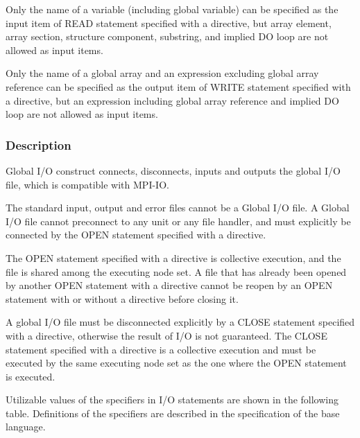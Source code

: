    Only the name of a variable (including global variable) can be specified 
   as the input item of READ statement specified with a \gio directive,
   but array element, array section,
   structure component, substring, and implied DO loop are not allowed as input items.

   Only the name of a global array
   and an expression excluding global array reference can be specified
   as the output item
   of WRITE statement specified with a \gio directive, 
   but an expression including global array
   reference and implied DO loop are not allowed as input items.
   \fi

   \subsubsection*{Description}

   Global I/O construct connects, disconnects, inputs and outputs the global I/O file,
   which is compatible with MPI-IO.

   The standard input, output and error files cannot be a Global I/O file.
   A Global I/O file cannot preconnect to any unit or any file handler,
   and must explicitly be connected by the OPEN statement specified with
   a \gio directive.

   The OPEN statement specified with a \gio directive is collective execution, and the file is shared among the executing node
   set.
   A file that has already been opened by another OPEN statement with
   a \gio directive cannot be reopen by an OPEN statement with or
   without a \gio directive before closing it.

   A global I/O file must be disconnected explicitly by a CLOSE
   statement specified with a \gio directive, otherwise the result of I/O
   is not guaranteed.
   The CLOSE statement specified with a \gio directive is a collective execution and must be executed by the same executing
   node set as the one where the OPEN statement is executed.

   Utilizable values of the specifiers in I/O statements are shown in the
   following table.
   Definitions of the specifiers are described in the specification of
   the base language.

